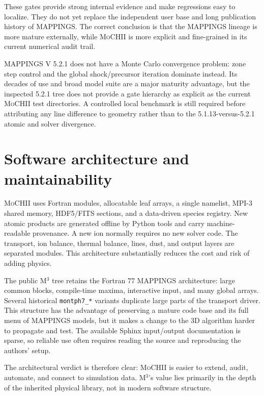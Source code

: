 \documentclass[english,a4paper]{my_memo}
\newcommand{\code}[1]{\texttt{#1}}
\newcommand{\MoCHII}{\textsc{MoCHII}}
\newcommand{\Mthree}{M$^3$}
\newcommand{\Mappings}{MAPPINGS V 5.2.1}
\begin{document}
These gates provide strong internal evidence and make regressions easy to
localize.  They do not yet replace the independent user base and long
publication history of MAPPINGS.  The correct conclusion is that
the MAPPINGS lineage is more mature externally, while \MoCHII{} is more explicit and
fine-grained in its current numerical audit trail.

\Mappings{} does not have a Monte Carlo convergence problem: zone step
control and the global shock/precursor iteration dominate instead.  Its
decades of use and broad model suite are a major maturity advantage, but
the inspected 5.2.1 tree does not provide a gate hierarchy as explicit as
the current \MoCHII{} test directories.  A controlled local benchmark is
still required before attributing any line difference to geometry rather
than to the 5.1.13-versus-5.2.1 atomic and solver divergence.

\section{Software architecture and maintainability}

\MoCHII{} uses Fortran modules, allocatable leaf arrays, a single namelist,
MPI-3 shared memory, HDF5/FITS sections, and a data-driven species
registry.  New atomic products are generated offline by Python tools and
carry machine-readable provenance.  A new ion normally requires no new
solver code.  The transport, ion balance, thermal balance, lines, dust,
and output layers are separated modules.  This architecture substantially
reduces the cost and risk of adding physics.

The public \Mthree{} tree retains the Fortran 77 MAPPINGS architecture:
large common blocks, compile-time maxima, interactive input, and many
global arrays.  Several historical \code{montph7\_*} variants duplicate
large parts of the transport driver.  This structure has the advantage of
preserving a mature code base and its full menu of MAPPINGS models, but it
makes a change to the 3D algorithm harder to propagate and test.  The
available Sphinx input/output documentation is sparse, so reliable use
often requires reading the source and reproducing the authors' setup.

The architectural verdict is therefore clear: \MoCHII{} is easier to
extend, audit, automate, and connect to simulation data.  \Mthree{}'s
value lies primarily in the depth of the inherited physical library, not
in modern software structure.
\end{document}
